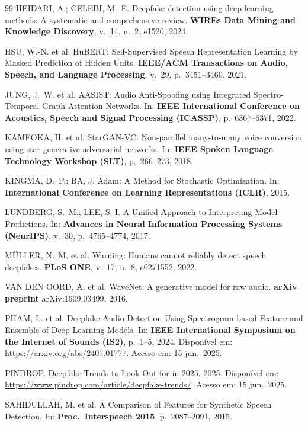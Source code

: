 \documentclass[12pt,a4paper]{article}
\begin{document}
\begin{thebibliography}{99}
HEIDARI, A.; CELEBI, M.~E.
Deepfake detection using deep learning methods: A systematic and comprehensive
review.
\textbf{WIREs Data Mining and Knowledge Discovery},
v.~14, n.~2, e1520, 2024.

HSU, W.-N. et al.
HuBERT: Self-Supervised Speech Representation Learning by Masked Prediction
of Hidden Units.
\textbf{IEEE/ACM Transactions on Audio, Speech, and Language Processing},
v.~29, p.~3451--3460, 2021.

JUNG, J.~W. et al.
AASIST: Audio Anti-Spoofing using Integrated Spectro-Temporal Graph Attention
Networks.
In: \textbf{IEEE International Conference on Acoustics, Speech and Signal
Processing (ICASSP)}, p.~6367--6371, 2022.

KAMEOKA, H. et al.
StarGAN-VC: Non-parallel many-to-many voice conversion using star generative
adversarial networks.
In: \textbf{IEEE Spoken Language Technology Workshop (SLT)},
p.~266--273, 2018.

KINGMA, D.~P.; BA, J.
Adam: A Method for Stochastic Optimization.
In: \textbf{International Conference on Learning Representations (ICLR)},
2015.

LUNDBERG, S.~M.; LEE, S.-I.
A Unified Approach to Interpreting Model Predictions.
In: \textbf{Advances in Neural Information Processing Systems (NeurIPS)},
v.~30, p.~4765--4774, 2017.

MÜLLER, N.~M. et al.
Warning: Humans cannot reliably detect speech deepfakes.
\textbf{PLoS ONE},
v.~17, n.~8, e0271552, 2022.

VAN DEN OORD, A. et al.
WaveNet: A generative model for raw audio.
\textbf{arXiv preprint} arXiv:1609.03499, 2016.

PHAM, L. et al.
Deepfake Audio Detection Using Spectrogram-based Feature and Ensemble of Deep
Learning Models.
In: \textbf{IEEE International Symposium on the Internet of Sounds (IS2)},
p.~1--5, 2024.
Disponível em: \url{https://arxiv.org/abs/2407.01777}.
Acesso em: 15 jun.\ 2025.

PINDROP.
Deepfake Trends to Look Out for in 2025.
2025.
Disponível em: \url{https://www.pindrop.com/article/deepfake-trends/}.
Acesso em: 15 jun.\ 2025.

SAHIDULLAH, M. et al.
A Comparison of Features for Synthetic Speech Detection.
In: \textbf{Proc.\ Interspeech 2015}, p.~2087--2091, 2015.


\end{thebibliography}
\end{document}
